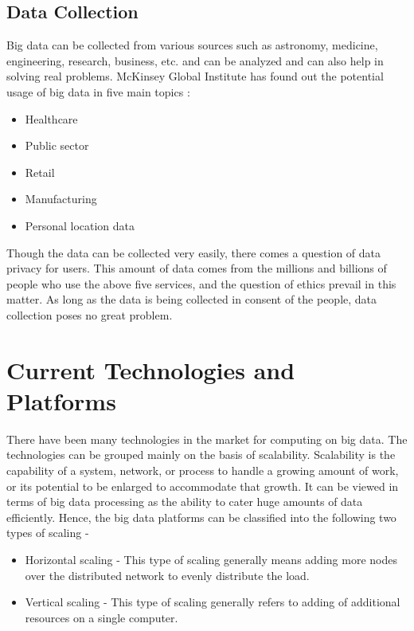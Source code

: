 \documentclass[journal]{IEEEtran}
\begin{document}
\subsection{Data Collection}
Big data can be collected from various sources such as astronomy, medicine, engineering, research, business, etc. and can be analyzed and can also help in solving real problems. McKinsey Global Institute has found out the potential usage of big data in five main topics \cite{manyika2011big} :
	\begin{itemize}
		\item Healthcare
        \item Public sector
        \item Retail
        \item Manufacturing
        \item Personal location data
	\end{itemize}
 Though the data can be collected very easily, there comes a question of data privacy for users. This amount of data comes from the millions and billions of people who use the above five services, and the question of ethics prevail in this matter. As long as the data is being collected in consent of the people, data collection poses no great problem. \cite{ceravolo2018big}

\section{Current Technologies and Platforms}
There have been many technologies in the market for computing on big data. The technologies can be grouped mainly on the basis of scalability. Scalability is the capability of a system, network, or process to handle a growing amount of work, or its potential to be enlarged to accommodate that growth. \cite{Bondi} It can be viewed in terms of big data processing as the ability to cater huge amounts of data efficiently. Hence, the big data platforms can be classified into the following two types of scaling -
\begin{itemize}
\item Horizontal scaling - This type of scaling generally means adding more nodes over the distributed network to evenly distribute the load.
\item Vertical scaling - This type of scaling generally refers to adding of additional resources on a single computer.
\end{itemize}
\end{document}
